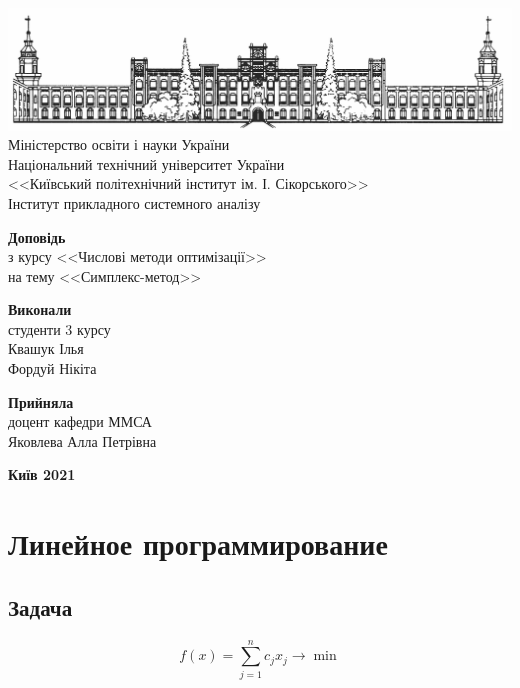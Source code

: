 \documentclass{report}
\begin{document}
\begin{titlepage}
    \thispagestyle{empty}
    \begin{center}
        \includegraphics[width = \textwidth]{pics/kpi}
        Міністерство освіти і науки України\\
        Національний технічний університет України\\
        <<Київський політехнічний інститут ім. І. Сікорського>>\\
        Інститут прикладного системного аналізу
    \end{center}
    \vspace{30mm}
    \begin{center}
        \fontsize{22}{26}\selectfont\textbf{Доповідь} \\
        з курсу <<Числові методи оптимізації>> \\
        на тему <<Симплекс-метод>>
    \end{center}
    \vspace{30mm}
    \begin{flushright}
        \textbf{Виконали} \\ 
        студенти 3 курсу \\
        Квашук Ілья \\
        Фордуй Нікіта
    \end{flushright}
    \begin{flushright}
        \textbf{Прийняла} \\
        доцент кафедри ММСА \\
        Яковлева Алла Петрівна
    \end{flushright}
    \vspace{45mm}
    \begin{center}
        \textbf{Київ 2021}
    \end{center}
\end{titlepage}

\section{Линейное программирование}
\subsection{Задача}
\begin{equation}
	f(x)=\sum_{j=1}^n c_j x_j \to \min
\end{equation}
\end{document}
